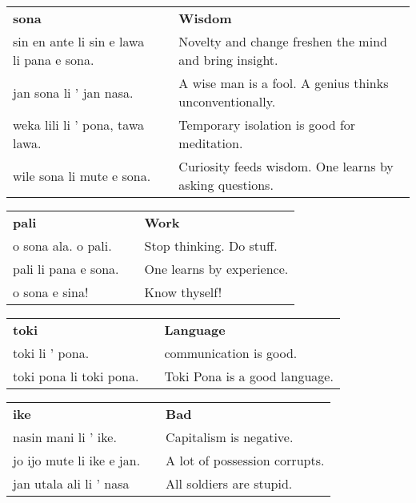 \begin{supertabular}{p{6cm}|ll}
    \textbf{sona}                             &  & \textbf{Wisdom}                                         \\
    sin en ante li sin e lawa li pana e sona. &  & Novelty and change freshen the mind and bring insight.  \\
    jan sona li ' jan nasa.                   &  & A wise man is a fool. A genius thinks unconventionally. \\
    weka lili li ' pona, tawa lawa.           &  & Temporary isolation is good for meditation.             \\
    wile sona li mute e sona.                 &  & Curiosity feeds wisdom. One learns by asking questions. \\
\end{supertabular}

\begin{supertabular}{p{6cm}|ll}
    \textbf{pali}        &  & \textbf{Work}             \\
    o sona ala. o pali.  &  & Stop thinking. Do stuff.  \\
    pali li pana e sona. &  & One learns by experience. \\
    o sona e sina!       &  & Know thyself!             \\
\end{supertabular}

\begin{supertabular}{p{6cm}|ll}
    \textbf{toki}           &  & \textbf{Language}             \\
    toki li ' pona.         &  & communication is good.        \\
    toki pona li toki pona. &  & Toki Pona is a good language. \\
\end{supertabular}

\begin{supertabular}{p{6cm}|ll}
    \textbf{ike}              &  & \textbf{Bad}                  \\
    nasin mani li ' ike.      &  & Capitalism is negative.       \\
    jo ijo mute li ike e jan. &  & A lot of possession corrupts. \\
    jan utala ali li ' nasa   &  & All soldiers are stupid.      \\
\end{supertabular}

